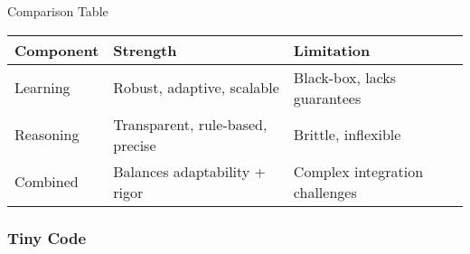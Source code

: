 \documentclass[
  letterpaper,
  DIV=11,
  numbers=noendperiod]{scrreprt}
\begin{document}
Comparison Table

\begin{longtable}[]{@{}
  >{\raggedright\arraybackslash}p{}
  >{\raggedright\arraybackslash}p{}
  >{\raggedright\arraybackslash}p{}@{}}
\toprule\noalign{}
\begin{minipage}[b]{\linewidth}\raggedright
Component
\end{minipage} & \begin{minipage}[b]{\linewidth}\raggedright
Strength
\end{minipage} & \begin{minipage}[b]{\linewidth}\raggedright
Limitation
\end{minipage} \\
\midrule\noalign{}
\endhead
\bottomrule\noalign{}
\endlastfoot
Learning & Robust, adaptive, scalable & Black-box, lacks guarantees \\
Reasoning & Transparent, rule-based, precise & Brittle, inflexible \\
Combined & Balances adaptability + rigor & Complex integration
challenges \\
\end{longtable}

\subsubsection{Tiny Code}\label{tiny-code-57}
\end{document}
